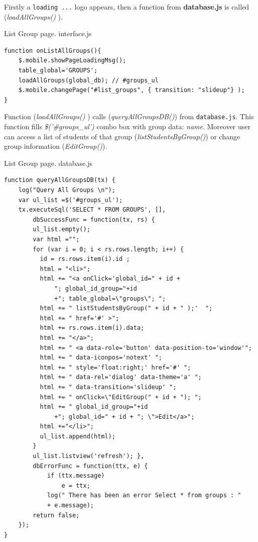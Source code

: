 Firstly a \texttt{loading ...} logo appears, then a function from {\bf database.js} is called (\emph{loadAllGroups() }).
\begin{bclogo}[couleur=blue!30,arrondi=0.1,ombre=true ] 
{List Group page. interface.js}
\begin{verbatim}
function onListAllGroups(){
    $.mobile.showPageLoadingMsg();
    table_global='GROUPS';
    loadAllGroups(global_db); // #groups_ul
    $.mobile.changePage("#list_groups", { transition: "slideup"} );
}
\end{verbatim}
\end{bclogo}

Function (\emph{loadAllGroups() }) calls (\emph{queryAllGroupsDB()}) from \texttt{database.js}. 
This function fills \textit{\$('\#groups\_ul')}  combo box with group data: \textit{name}. Moreover user
can access  a list of students of that group (\textit{listStudentsByGroup()}) or change
group information (\textit{EditGroup()}).


\begin{bclogo}[couleur=blue!30,arrondi=0.1,ombre=true ] 
{List Group page. database.js}
\begin{verbatim}
function queryAllGroupsDB(tx) {
    log("Query All Groups \n");
    var ul_list =$('#groups_ul');
    tx.executeSql('SELECT * FROM GROUPS', [],
        dbSuccessFunc = function(tx, rs) {
        ul_list.empty();
        var html ="";
        for (var i = 0; i < rs.rows.length; i++) {
          id = rs.rows.item(i).id ;
          html = "<li>";
          html += "<a onClick='global_id=" + id + 
              "; global_id_group="+id
              +"; table_global=\"groups\"; ";
          html += " listStudentsByGroup(" + id + " );'  ";
          html += " href='#' >";
          html += rs.rows.item(i).data;
          html += "</a>";
          html += " <a data-role='button' data-position-to='window'";
          html += " data-iconpos='notext' ";
          html += " style='float:right;' href='#' ";
          html += " data-rel='dialog' data-theme='a' ";
          html += " data-transition='slideup' ";
          html += " onClick=\"EditGroup(" + id + "); ";
          html += " global_id_group="+id
              +"; global_id=" + id + "; \">Edit</a>";
          html +="</li>";
          ul_list.append(html);
        }
        ul_list.listview('refresh'); },
        dbErrorFunc = function(ttx, e) {
            if (ttx.message)
                e = ttx;
            log(" There has been an error Select * from groups : " 
            + e.message);
        return false;
    });
}
\end{verbatim}
\end{bclogo}


